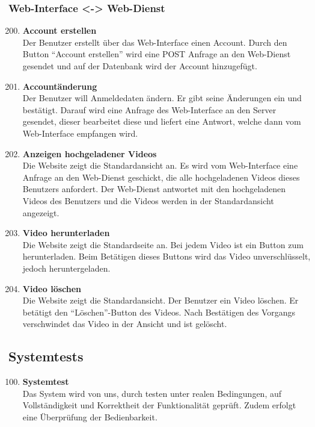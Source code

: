 \subsubsection{\gls{Web-Interface} <-> \gls{Web-Dienst}}
\begin{enumerate}[\bfseries{T}10]  
\setcounter{enumi}{199}{}

\item \textbf{Account erstellen} \hfill\\
Der Benutzer erstellt \"uber das \gls{Web-Interface} einen Account. Durch den Button ``Account erstellen'' wird eine POST Anfrage an den \gls{Web-Dienst} gesendet und auf der Datenbank wird der Account hinzugef\"ugt.

\item \textbf{Account\"anderung} \hfill\\
Der Benutzer will Anmeldedaten \"andern. Er gibt seine Änderungen ein und best\"atigt. Darauf wird eine Anfrage des \gls{Web-Interface} an den Server gesendet, dieser bearbeitet diese und liefert eine Antwort, welche dann vom \gls{Web-Interface} empfangen wird.

\item \textbf{Anzeigen hochgeladener Videos} \hfill\\
Die Website zeigt die Standardansicht an. Es wird vom \gls{Web-Interface} eine Anfrage an den \gls{Web-Dienst} geschickt, die alle hochgeladenen Videos dieses Benutzers anfordert. Der \gls{Web-Dienst} antwortet mit den hochgeladenen Videos des Benutzers und die Videos werden in der Standardansicht angezeigt. 

\item \textbf{Video herunterladen} \hfill\\
Die Website zeigt die Standardseite an. Bei jedem Video ist ein Button zum herunterladen. Beim Bet\"atigen dieses Buttons wird das Video unverschl\"usselt, jedoch  heruntergeladen.

\item \textbf{Video l\"oschen} \hfill\\
Die Website zeigt die Standardansicht. Der Benutzer ein Video l\"oschen. Er bet\"atigt den ``L\"oschen''-Button des Videos. Nach Best\"atigen des Vorgangs verschwindet das Video in der Ansicht und ist gel\"oscht.

\end{enumerate}

\subsection{Systemtests}
\begin{enumerate}[\bfseries{T}10]  
\setcounter{enumi}{99}{}

\item \textbf{Systemtest} \hfill\\  
Das System wird von uns, durch testen unter realen Bedingungen, auf Vollständigkeit und Korrektheit der Funktionalität geprüft. Zudem erfolgt eine Überprüfung der Bedienbarkeit. 
\end{enumerate}
